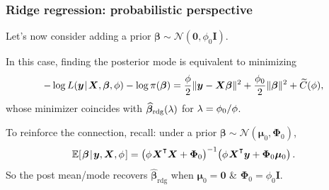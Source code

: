\documentclass[18pt, handout]{beamer}
\newcommand{\defineTightSpacing}{%
	\setlength{\abovedisplayskip}{.25\baselineskip}%
	\setlength{\belowdisplayskip}{.25\baselineskip}%
}
\newcommand{\given}{\thinnerspace | \thinnerspace}
\newcommand{\transpose}{\text{\raisebox{.5ex}{$\intercal$}}}
\newcommand{\thinnerspace}{\mskip.5\thinmuskip}
\newcommand{\expectation}{\mathbb{E}}
\newcommand{\normalDist}{\mathcal{N}}
\newcommand{\density}{\pi}
\newcommand{\likelihood}{L}
\newcommand{\by}{\bm{y}}
\newcommand{\bX}{\bm{X}}
\newcommand{\bmu}{\bm{\mu}}
\newcommand{\bbeta}{\bm{\beta}}
\newcommand{\Id}{\bm{I}}
\newcommand{\bPhi}{\bm{\Phi}}
\begin{document}
\begin{frame}
\frametitle{Ridge regression: probabilistic perspective}
Let's now consider adding a prior $\bbeta \sim \normalDist(\bm{0}, \phi_0 \Id)$. 

\smallskip
In this case, finding the posterior mode is equivalent to minimizing
\begin{equation*} \defineTightSpacing%
- \log \likelihood(\by \given \bX, \bbeta, \phi) - \log \density(\bbeta)
	= \frac{\phi}{2} \| \by - \bX \bbeta \|^2 + \frac{\phi_0}{2} \| \bbeta \|^2 + \widetilde{C}(\phi),
\end{equation*}
whose minimizer coincides with $\widehat{\bbeta}_{\mathrm{rdg}}(\penaltyParam)$ for $\lambda = \phi_0 / \phi$.

\smallskip
To reinforce the connection, recall: under a prior $\bbeta \sim \normalDist(\bmu_0, \bPhi_0)$,
\begin{equation*} \defineTightSpacing%
\expectation\!\left[
	\thinnerspace \bbeta \given \by, \bX, \phi \thinnerspace
\right]
	= \left( \phi \thinnerspace \bX^\transpose \bX + \bPhi_0 \right)^{-1} \! \left( \phi \thinnerspace \bX^\transpose \bm{y} + \bPhi_0 \bmu_0 \right).
\end{equation*}
So the post mean/mode recovers $\widehat{\bbeta}_{\mathrm{rdg}}$ when $\bmu_0 = \bm{0}$ \& $\bPhi_0 = \phi_0 \Id$.
\end{frame}
\end{document}
